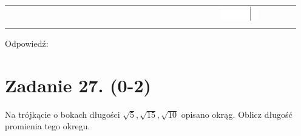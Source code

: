 \documentclass[10pt]{article}
\begin{document}
\begin{center}
\begin{tabular}{|c|c|c|c|c|c|c|c|c|c|c|c|c|c|c|c|c|c|c|c|c|c|c|c|c|c|c|c|c|c|}
 &  &  \\
\hline
 &  &  &  &  &  &  &  &  &  &  &  &  &  &  &  &  &  &  &  &  &  &  &  &  & \includegraphics[max width=\textwidth]{2024_11_21_e15da647cf0a41077ac3g-10(4)}
 &  &  &  &  \\
\hline
 &  &  &  &  &  &  &  &  &  &  &  &  &  &  &  &  &  &  &  &  &  &  &  &  &  &  &  &  &  \\
\hline
\end{tabular}
\end{center}

Odpowiedź:

\section*{Zadanie 27. (0-2)}
Na trójkącie o bokach długości \(\sqrt{5}, \sqrt{15}, \sqrt{10}\) opisano okrąg. Oblicz długość promienia tego okregu.
\end{document}
